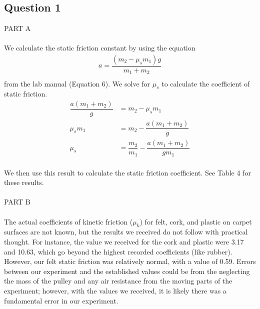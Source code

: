 \documentclass [12pt, letterpaper, twoside] {article}
\begin{document}
\subsection* {Question 1}
PART A \\\\
We calculate the static friction constant by using the equation 
\begin {equation}
  \begin {split}
    a = \dfrac{(m_{2}-\mu_{s}m_{1})g}{m_{1}+m_{2}} \\
  \end {split}
\end {equation} 
from the lab manual (Equation 6). We solve for \(\mu_{s}\) to calculate the coefficient of static friction.
\begin {equation*}
  \begin {split}
    \dfrac{a(m_{1}+m_{2})}{g} & = m_{2}-\mu_{s}m_{1} \\
    \mu_{s}m_{1} & = m_{2}-\dfrac{a(m_{1}+m_{2})}{g} \\
    \mu_{s} & = \dfrac{m_{2}}{m_{1}}-\dfrac{a(m_{1}+m_{2})}{gm_{1}} \\
  \end {split}
\end {equation*}

\noindent
We then use this result to calculate the static friction coefficient. See Table 4 for these results. \\\\

\noindent
PART B \\\\
The actual coefficients of kinetic friction (\(\mu_{k}\)) for felt, cork, and plastic on carpet surfaces are not known, but the results we received do not follow with practical thought. For instance, the value we received for the cork and plastic were 3.17 and 10.63, which go beyond the highest recorded coefficients (like rubber). However, our felt static friction was relatively normal, with a value of 0.59. Errors between our experiment and the established values could be from the neglecting the mass of the pulley and any air resistance from the moving parts of the experiment; however, with the values we received, it is likely there was a fundamental error in our experiment. \\\\
\end{document}
